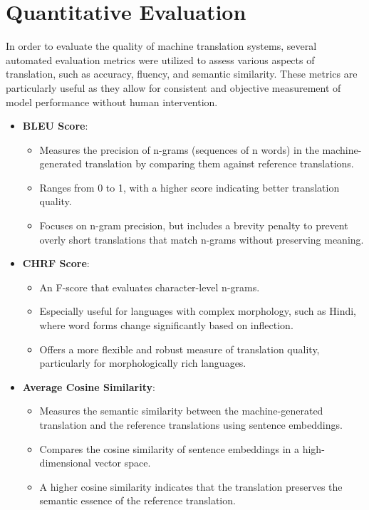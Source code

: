 \documentclass[letterpaper,11pt]{report}
\begin{document}
\section{Quantitative Evaluation}

In order to evaluate the quality of machine translation systems, several automated evaluation metrics were utilized to assess various aspects of translation, such as accuracy, fluency, and semantic similarity. These metrics are particularly useful as they allow for consistent and objective measurement of model performance without human intervention.

\begin{itemize}
    \item \textbf{BLEU Score}: 
    \begin{itemize}
        \item Measures the precision of n-grams (sequences of n words) in the machine-generated translation by comparing them against reference translations.
        \item Ranges from 0 to 1, with a higher score indicating better translation quality.
        \item Focuses on n-gram precision, but includes a brevity penalty to prevent overly short translations that match n-grams without preserving meaning.
    \end{itemize}
    
    \item \textbf{CHRF Score}: 
    \begin{itemize}
        \item An F-score that evaluates character-level n-grams.
        \item Especially useful for languages with complex morphology, such as Hindi, where word forms change significantly based on inflection.
        \item Offers a more flexible and robust measure of translation quality, particularly for morphologically rich languages.
    \end{itemize}
    
    \item \textbf{Average Cosine Similarity}: 
    \begin{itemize}
        \item Measures the semantic similarity between the machine-generated translation and the reference translations using sentence embeddings.
        \item Compares the cosine similarity of sentence embeddings in a high-dimensional vector space.
        \item A higher cosine similarity indicates that the translation preserves the semantic essence of the reference translation.
    \end{itemize}
    

\end{itemize}
\end{document}
